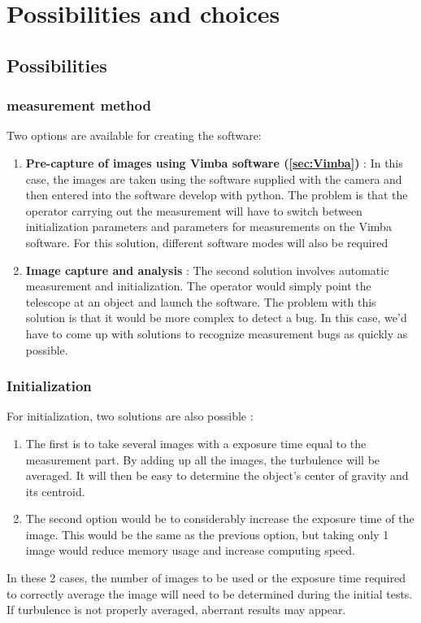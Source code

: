 \section{Possibilities and choices}
\subsection{Possibilities}
\subsubsection{measurement method}
Two options are available for creating the software:
\begin{enumerate}
    \item \textbf{Pre-capture of images using Vimba software (\ref{sec:Vimba})} : \newline
          In this case, the images are taken using the software supplied with the camera and then entered into the software develop with python.
          The problem is that the operator carrying out the measurement will have to switch between initialization parameters and parameters
          for measurements on the Vimba software. For this solution, different software modes will also be required
    \item \textbf{Image capture and analysis} :\newline
          The second solution involves automatic measurement and initialization. The operator would simply point the telescope at an
          object and launch the software. The problem with this solution is that it would be more complex to detect a bug. In this case,
          we'd have to come up with solutions to recognize measurement bugs as quickly as possible.
\end{enumerate}
\subsubsection{Initialization}
For initialization, two solutions are also possible :
\begin{enumerate}
    \item The first is to take several images with a exposure time equal to the measurement part. By adding up all the images,
          the turbulence will be averaged. It will then be easy to determine the object's center of gravity and its centroid.
    \item The second option would be to considerably increase the exposure time of the image. This would be the same as the
          previous option, but taking only 1 image would reduce memory usage and increase computing speed.
\end{enumerate}
In these 2 cases, the number of images to be used or the exposure time required to correctly average the image will need to
be determined during the initial tests. If turbulence is not properly averaged, aberrant results may appear.

